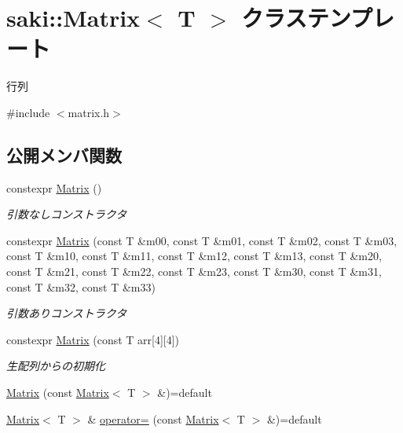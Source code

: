 \hypertarget{classsaki_1_1_matrix}{}\section{saki\+:\+:Matrix$<$ T $>$ クラステンプレート}
\label{classsaki_1_1_matrix}


行列  




{\ttfamily \#include $<$matrix.\+h$>$}

\subsection*{公開メンバ関数}
\begin{DoxyCompactItemize}
\item 
constexpr \mbox{\hyperlink{classsaki_1_1_matrix_a820035e9bafc0fa4269c4b94b1ec4f4f}{Matrix}} ()
\begin{DoxyCompactList}\small\item\em 引数なしコンストラクタ \end{DoxyCompactList}\item 
constexpr \mbox{\hyperlink{classsaki_1_1_matrix_ad4f497bd4ba2b7de464afea4436d9a51}{Matrix}} (const T \&m00, const T \&m01, const T \&m02, const T \&m03, const T \&m10, const T \&m11, const T \&m12, const T \&m13, const T \&m20, const T \&m21, const T \&m22, const T \&m23, const T \&m30, const T \&m31, const T \&m32, const T \&m33)
\begin{DoxyCompactList}\small\item\em 引数ありコンストラクタ \end{DoxyCompactList}\item 
constexpr \mbox{\hyperlink{classsaki_1_1_matrix_a945fec9cbcb1b175ac993db6a5c0cbd8}{Matrix}} (const T arr\mbox{[}4\mbox{]}\mbox{[}4\mbox{]})
\begin{DoxyCompactList}\small\item\em 生配列からの初期化 \end{DoxyCompactList}\item 
\mbox{\hyperlink{classsaki_1_1_matrix_a08d28bd14af9be6650325574a20101d7}{Matrix}} (const \mbox{\hyperlink{classsaki_1_1_matrix}{Matrix}}$<$ T $>$ \&)=default
\item 
\mbox{\hyperlink{classsaki_1_1_matrix}{Matrix}}$<$ T $>$ \& \mbox{\hyperlink{classsaki_1_1_matrix_af83ebe0a4f4652fbf30dd64307021603}{operator=}} (const \mbox{\hyperlink{classsaki_1_1_matrix}{Matrix}}$<$ T $>$ \&)=default
\item 

\end{DoxyCompactItemize}
